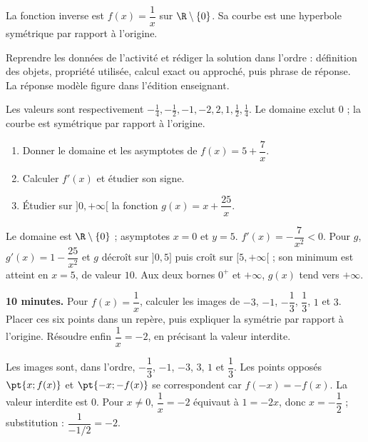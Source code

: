 \begin{summary}La fonction inverse est $f(x)=\dfrac1x$ sur $\R\setminus\{0\}$. Sa courbe est une hyperbole symétrique par rapport à l'origine.\end{summary}

\begin{example}
Reprendre les données de l'activité et rédiger la solution dans l'ordre : définition des objets, propriété utilisée, calcul exact ou approché, puis phrase de réponse. La réponse modèle figure dans l'édition enseignant.
\end{example}
\begin{solution}Les valeurs sont respectivement $-\frac14,-\frac12,-1,-2,2,1,\frac12,\frac14$. Le domaine exclut $0$ ; la courbe est symétrique par rapport à l'origine.\end{solution}

\begin{exercise}[essentiel]
\begin{enumerate}\item Donner le domaine et les asymptotes de $f(x)=5+\dfrac{7}x$.\item Calculer $f'(x)$ et étudier son signe.\item Étudier sur $]0,+\infty[$ la fonction $g(x)=x+\dfrac{25}x$.\end{enumerate}
\end{exercise}
\begin{solution}Le domaine est $\R\setminus\{0\}$ ; asymptotes $x=0$ et $y=5$. $f'(x)=-\dfrac{7}{x^2}<0$. Pour $g$, $g'(x)=1-\dfrac{25}{x^2}$ et $g$ décroît sur $]0,5]$ puis croît sur $[5,+\infty[$ ; son minimum est atteint en $x=5$, de valeur $10$. Aux deux bornes $0^+$ et $+\infty$, $g(x)$ tend vers $+\infty$.\end{solution}


\begin{homework}\textbf{10 minutes.} Pour $f(x)=\dfrac1x$, calculer les images de $-3$, $-1$, $-\dfrac13$, $\dfrac13$, $1$ et $3$. Placer ces six points dans un repère, puis expliquer la symétrie par rapport à l'origine. Résoudre enfin $\dfrac1x=-2$, en précisant la valeur interdite.\end{homework}
\begin{solution}Les images sont, dans l'ordre, $-\dfrac13$, $-1$, $-3$, $3$, $1$ et $\dfrac13$. Les points opposés $\pt{x;f(x)}$ et $\pt{-x;-f(x)}$ se correspondent car $f(-x)=-f(x)$. La valeur interdite est $0$. Pour $x\neq0$, $\dfrac1x=-2$ équivaut à $1=-2x$, donc $x=-\dfrac12$ ; substitution : $\dfrac1{-1/2}=-2$.\end{solution}

